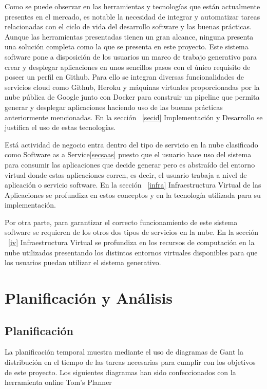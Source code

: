 \documentclass[a4paper,11pt]{book}
\begin{document}
Como se puede observar en las herramientas y tecnologías que están actualmente presentes en el mercado, es notable la necesidad de integrar y automatizar tareas relacionadas con el ciclo de vida del desarrollo software y las buenas prácticas. Aunque las herramientas presentadas tienen un gran alcance, ninguna presenta una solución completa como la que se presenta en este proyecto. Este sistema software pone a disposición de los usuarios un marco de trabajo generativo para crear y desplegar aplicaciones en unos sencillos pasos con el único requisito de poseer un perfil en Github. Para ello se integran diversas funcionalidades de servicios cloud como Github, Heroku y máquinas virtuales proporcionadas por la nube pública de Google  junto con Docker para construir un pipeline que permita generar y desplegar aplicaciones haciendo uso de las buenas prácticas anteriormente mencionadas. En la sección ~\ref{secid} Implementación y Desarrollo se justifica el uso de estas tecnologías. 

Está actividad de negocio entra dentro del tipo de servicio en la nube clasificado como Software as a Service\ref{secsaas} puesto que el usuario hace uso del sistema para consumir las aplicaciones que decide generar pero es abstraído del entorno virtual donde estas aplicaciones corren, es decir, el usuario trabaja a nivel de aplicación o servicio software. En la sección ~\ref{infra}  Infraestructura Virtual de las Aplicaciones se profundiza en estos conceptos y en la tecnología utilizada para su implementación. 

Por otra parte, para garantizar el correcto funcionamiento de este sistema software se requieren de los otros dos tipos de servicios en la nube. En la sección ~\ref{iv} Infraestructura Virtual se profundiza en los recursos de computación en la nube utilizados presentando los distintos entornos virtuales disponibles para que los usuarios puedan utilizar el sistema generativo.


\chapter{Planificación y Análisis}

\section{Planificación}

La planificación temporal muestra mediante el uso de diagramas de Gant la distribución en el tiempo de las tareas necesarias para cumplir con los objetivos de este proyecto. Los siguientes diagramas han sido confeccionados con la herramienta online Tom's Planner~\cite{tom}
\end{document}
